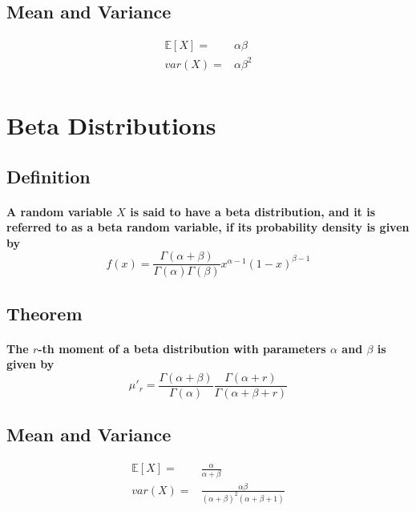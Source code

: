 \documentclass[titlepage]{article}
\begin{document}
        \subsection*{Mean and Variance}
            \begin{equation*}
                \begin{split}
                    \mathbb{E}[X]=&\alpha\beta\\
                    var(X)=&\alpha\beta^2\\
                \end{split}
            \end{equation*}
    \section{Beta Distributions}
        \subsection*{Definition}
            \paragraph{
                A random variable $X$ is said to have a beta distribution, and it is referred to as a beta random variable, if its probability density is given by
                $$f(x)=\frac{\Gamma(\alpha+\beta)}{\Gamma(\alpha)\Gamma(\beta)}x^{\alpha-1}(1-x)^{\beta-1}$$
            }
        \subsection*{Theorem}
            \paragraph{
                The $r$-th moment of a beta distribution with parameters $\alpha$ and $\beta$ is given by 
                $$\mu'_r=\frac{\Gamma(\alpha+\beta)}{\Gamma(\alpha)}\frac{\Gamma(\alpha+r)}{\Gamma(\alpha+\beta
                +r)}$$
            }
        \subsection*{Mean and Variance}
            \begin{equation*}
                \begin{split}
                    \mathbb{E}[X]=&\frac{\alpha}{\alpha+\beta}\\
                    var(X)=&\frac{\alpha\beta}{(\alpha+\beta)^2(\alpha+\beta+1)}\\
                \end{split}
            \end{equation*}
\end{document}

